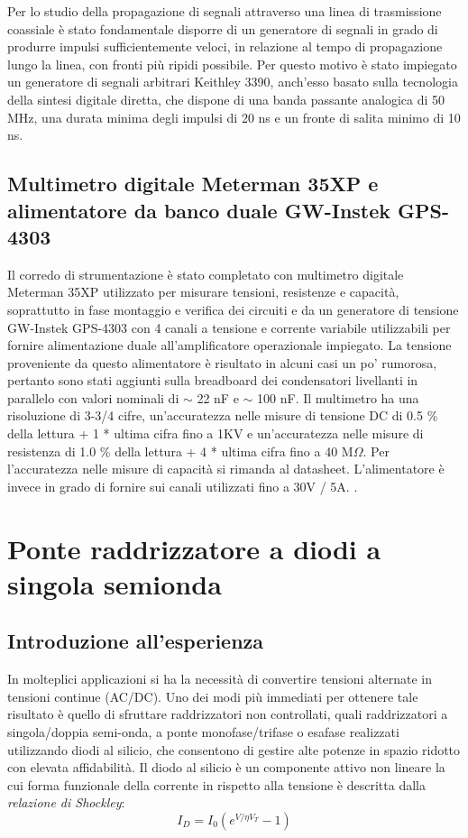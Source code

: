 \documentclass[journal]{IEEEtran}
\begin{document}
Per lo studio della propagazione di segnali attraverso una linea di trasmissione coassiale è stato fondamentale disporre di un generatore di segnali in grado di produrre impulsi sufficientemente veloci, in relazione al tempo di propagazione lungo la linea, con fronti più ripidi possibile. Per questo motivo è stato impiegato un generatore di segnali arbitrari Keithley 3390, anch'esso basato sulla tecnologia della sintesi digitale diretta, che dispone di una banda passante analogica di 50 MHz, una durata minima degli impulsi di 20 ns e un fronte di salita minimo di 10 ns. \cite{F}

\subsection{\textbf{Multimetro digitale Meterman 35XP e alimentatore da banco duale GW-Instek GPS-4303}}
Il corredo di strumentazione è stato completato con multimetro digitale Meterman 35XP utilizzato per misurare tensioni, resistenze e capacità, soprattutto in fase montaggio e verifica dei circuiti e da un generatore di tensione GW-Instek GPS-4303 con 4 canali a tensione e corrente variabile utilizzabili per fornire alimentazione duale all'amplificatore operazionale impiegato. La tensione proveniente da questo alimentatore è risultato in alcuni casi un po' rumorosa, pertanto sono stati aggiunti sulla breadboard dei condensatori livellanti in parallelo con valori nominali di $\sim$ 22 nF e $\sim$ 100 nF. Il multimetro ha una risoluzione di 3-3/4 cifre, un'accuratezza nelle misure di tensione DC di 0.5 \% della lettura + 1 * ultima cifra fino a 1KV e un'accuratezza nelle misure di resistenza di 1.0 \% della lettura + 4 * ultima cifra fino a 40 M$\Omega$. Per l'accuratezza nelle misure di capacità si rimanda al datasheet. L'alimentatore è invece in grado di fornire sui canali utilizzati fino a 30V / 5A. \cite{C} \cite{D}.
\section{\textbf{Ponte raddrizzatore a diodi a singola semionda}} %
\subsection{\textbf{Introduzione all'esperienza}}
In molteplici applicazioni si ha la necessità di convertire tensioni alternate in tensioni continue (AC/DC). Uno dei modi più immediati per ottenere tale risultato è quello di sfruttare raddrizzatori non controllati, quali raddrizzatori a singola/doppia semi-onda, a ponte monofase/trifase o esafase realizzati utilizzando diodi al silicio, che consentono di gestire alte potenze in spazio ridotto con elevata affidabilità. Il diodo al silicio è un componente attivo non lineare la cui forma funzionale della corrente in rispetto alla tensione è descritta dalla \textit{relazione di Shockley}: 
\begin{equation}
    I_{D} = I_{0}(e^{V/\eta V_T}-1)
\end{equation}
\end{document}

